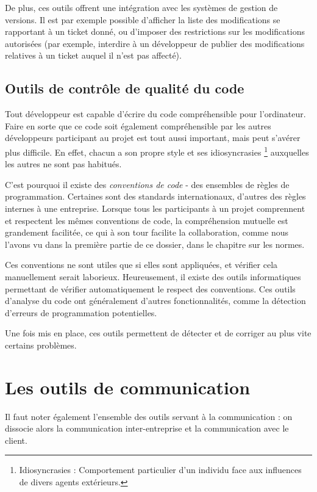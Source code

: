 De plus, ces outils offrent une intégration avec les systèmes de gestion de versions. Il est par exemple possible d’afficher la liste des modifications se rapportant à un ticket donné, ou d’imposer des restrictions sur les modifications autorisées (par exemple, interdire à un développeur de publier des modifications relatives à un ticket auquel il n’est pas affecté).

\subsection{Outils de contrôle de qualité du code}

Tout développeur est capable d’écrire du code compréhensible pour l’ordinateur. Faire en sorte que ce code soit également compréhensible par les autres développeurs participant au projet est tout aussi important, mais peut s’avérer plus difficile. En effet, chacun a son propre style et ses idiosyncrasies \footnote{Idiosyncrasies : Comportement particulier d'un individu face aux influences de divers agents extérieurs.} auxquelles les autres ne sont pas habitués.

C’est pourquoi il existe des \textit{conventions de code} - des ensembles de règles de programmation. Certaines sont des standards internationaux, d’autres des règles internes à une entreprise. Lorsque tous les participants à un projet comprennent et respectent les mêmes conventions de code, la compréhension mutuelle est grandement facilitée, ce qui à son tour facilite la collaboration, comme nous l'avons vu dans la première partie de ce dossier, dans le chapitre sur les normes.

Ces conventions ne sont utiles que si elles sont appliquées, et vérifier cela manuellement serait laborieux. Heureusement, il existe des outils informatiques permettant de vérifier automatiquement le respect des conventions. Ces outils d’analyse du code ont généralement d’autres fonctionnalités, comme la détection d’erreurs de programmation potentielles.

Une fois mis en place, ces outils permettent de détecter et de corriger au plus vite certains problèmes.

\section{Les outils de communication}

Il faut noter également l'ensemble des outils servant à la communication : on dissocie alors la communication inter-entreprise et la communication avec le client.

